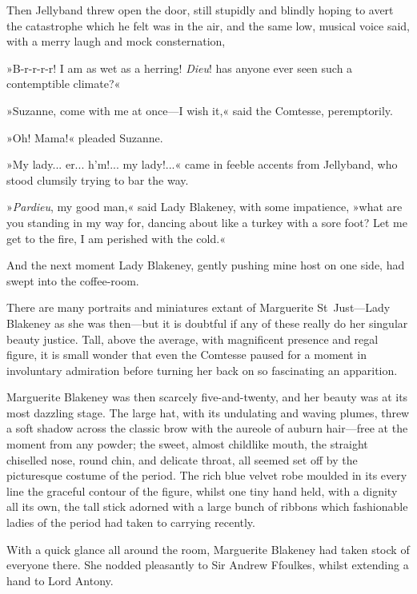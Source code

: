 Then Jellyband threw open the door, still stupidly and blindly hoping to avert the catastrophe which he felt was in the air, and the same low, musical voice said, with a merry laugh and mock consternation,\longdash


»B-r-r-r-r! I am as wet as a herring! \textit{Dieu}! has anyone ever seen such a contemptible climate?«

»Suzanne, come with me at once\allowbreak---\allowbreak I wish it,« said the Comtesse, peremptorily.

»Oh! Mama!« pleaded Suzanne.

»My lady... er... h'm!... my lady!...« came in feeble accents from Jellyband, who stood clumsily trying to bar the way.

»\textit{Pardieu}, my good man,« said Lady Blakeney, with some impatience, »what are you standing in my way for, dancing about like a turkey with a sore foot? Let me get to the fire, I am perished with the cold.«

And the next moment Lady Blakeney, gently pushing mine host on one side, had swept into the coffee-room.

There are many portraits and miniatures extant of Marguerite St~Just\allowbreak---\allowbreak Lady Blakeney as she was then\allowbreak---\allowbreak but it is doubtful if any of these really do her singular beauty justice. Tall, above the average, with magnificent presence and regal figure, it is small wonder that even the Comtesse paused for a moment in involuntary admiration before turning her back on so fascinating an apparition.

Marguerite Blakeney was then scarcely five-and-twenty, and her beauty was at its most dazzling stage. The large hat, with its undulating and waving plumes, threw a soft shadow across the classic brow with the aureole of auburn hair\allowbreak---\allowbreak free at the moment from any powder; the sweet, almost childlike mouth, the straight chiselled nose, round chin, and delicate throat, all seemed set off by the picturesque costume of the period. The rich blue velvet robe moulded in its every line the graceful contour of the figure, whilst one tiny hand held, with a dignity all its own, the tall stick adorned with a large bunch of ribbons which fashionable ladies of the period had taken to carrying recently.

With a quick glance all around the room, Marguerite Blakeney had taken stock of everyone there. She nodded pleasantly to Sir Andrew Ffoulkes, whilst extending a hand to Lord Antony.

